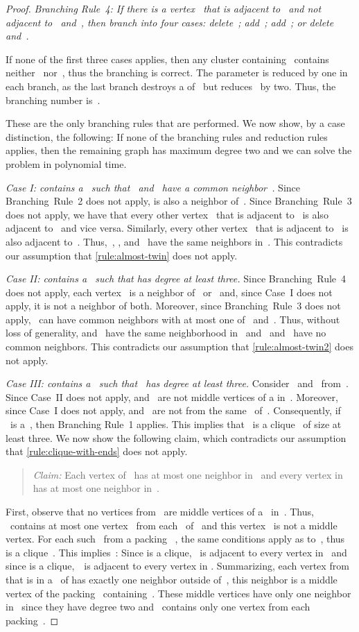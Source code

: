 \documentclass[envcountsame,numbook,smallextended]{svjour3}
\numberwithin{equation}{section}
\numberwithin{figure}{section}
\begin{document}
\begin{proof}
  \emph{Branching Rule~4: If there is a vertex~ that is adjacent to~ and not
    adjacent to~ and~, then branch into four cases:
  delete~; add~; add~;
  or delete~ and~.}

  If none of the first three cases applies,
  then any cluster containing~
  contains neither~ nor~,
  thus the branching is correct.
  The parameter is reduced by one in each
  branch, as the last branch destroys a  of~ but
  reduces~ by two. Thus, the branching number is~.

  These are the only branching rules that are performed. We now show, by a case
  distinction, the following: If none of the branching rules and reduction rules applies,
  then the remaining graph has maximum degree two and we can solve the problem in
  polynomial time.

  \emph{Case I:  contains a~  such that~ and~ have a common
    neighbor~.} Since Branching~Rule~2 does not apply,  is also a
  neighbor of~. Since Branching~Rule~3 does not apply, we have that every other vertex~ that is adjacent to~ is also adjacent to~ and vice versa. Similarly, every other vertex~ that is adjacent to~ is also adjacent to~. Thus,~, ,
  and~ have the same neighbors in~. 
This contradicts our assumption that
\cref{rule:almost-twin} does not apply.

  \emph{Case II:  contains a~  such that
     has degree at least three.}
  Since Branching~Rule~4 does not apply,
  each vertex~ is a neighbor
  of~ or~ and,
  since Case~I does not apply,
  it is not a neighbor of both.
  Moreover, since Branching~Rule~3 does not apply,
  ~can have common neighbors with at most one
  of~ and~.
  Thus, without
  loss of generality,  and~ have the same neighborhood
  in~ and~ and~ have no common neighbors.
  This contradicts our assumption that 
  \cref{rule:almost-twin2} does not apply.

  \emph{Case III:  contains a~  such that~ has degree at least three.}  
  Consider~ and~ from~.
  Since Case~II does not apply,  and~ are not middle vertices
  of a  in~.
  Moreover, since Case~I does not apply, 
   and~ are not from the same~ of~.
  Consequently, if ~is a~, then Branching Rule~1 applies.
  This implies that ~is a clique~ of size at least three.
  We now show the following claim, which contradicts our assumption
  that \cref{rule:clique-with-ends} does not apply.
  \begin{quote}
    \emph{Claim:} Each vertex of~ has at most one neighbor in~ and every
    vertex in~ has at most one neighbor in~.
  \end{quote}
  First, observe that no vertices from~ are middle vertices of a~
  in~. Thus, ~contains at most one vertex~ from each~ of~
  and this vertex~ is not a middle vertex. For each such~ from a packing~
  , the same conditions apply as to~, thus~ is a
  clique~. This implies~: Since  is a
  clique, ~is adjacent to every vertex in~ and since
   is a clique,~~is adjacent to every vertex in . Summarizing, each vertex from~ that is in a~ of  has exactly
  one neighbor outside of~, this neighbor is a middle vertex of the packing~
  containing~. These middle vertices have only one neighbor in~ since they have
  degree two and~ contains only one vertex from each packing~.


\end{proof}
\end{document}

